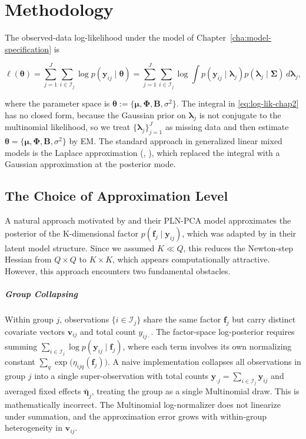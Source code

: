 \chapter{Methodology}
\label{cha:methodology}

The observed-data log-likelihood under the model of Chapter~\ref{cha:model-specification} is

\begin{equation}
    \ell(\bm{\theta})=\sum_{j=1}^{J}\sum_{i\in \mathcal{I}_{j}}\log p(\bm{y}_{ij}\mid \bm{\theta})=\sum_{j=1}^{J}\sum_{i\in \mathcal{I}_{j}}\log \int p(\bm{y}_{ij}\mid \bm{\lambda}_{j})p(\bm{\lambda}_{j}\mid \bm{\Sigma})\,d\bm{\lambda}_{j},
    \label{eq:log-lik-chap2}
\end{equation}

where the parameter space is $\bm{\theta}:=\{\bm{\mu}, \bm{\Phi}, \mathbf{B},\sigma^{2}\}$. The integral in \eqref{eq:log-lik-chap2} has no closed form, because the Gaussian prior on $\bm{\lambda}_{j}$ is not conjugate to the multinomial likelihood, so we treat $\{\bm{\lambda}_{j}\}_{j=1}^{J}$ as missing data and then estimate $\bm{\theta}=\{\bm{\mu}, \bm{\Phi}, \mathbf{B},\sigma^{2}\}$ by EM. The standard approach in generalized linear mixed models is the Laplace approximation (\citep{Breslow_1993}, \citep{Tierney01031986}), which replaced the integral with a Gaussian approximation at the posterior mode.

\iffalse
\section{The Choice of Approximation Level}
\label{sec:the-choice-of-approximation-level}

A natural approach motivated by \citet{chiquet2018variational} and their PLN-PCA model approximates the posterior of the K-dimensional factor $p(\mathbf{f}_{j}\mid \bm{y}_{ij})$, which was adapted by \citet{mcgillycuddy2024parsimoniouslyfittinglargemultivariate} in their latent model structure. Since we assumed $K\ll Q$, this reduces the Newton-step Hessian from $Q\times Q$ to $K\times K$, which appears computationally attractive. However, this approach encounters two fundamental obstacles. 

\paragraph*{Group Collapsing} Within group $j$, observations $\{i\in \mathcal{I}_{j}\}$ share the same factor $\mathbf{f}_{j}$ but carry distinct covariate vectors $\bm{v}_{ij}$ and total count $y_{ij\cdot}$. The factor-space log-posterior requires summing $\sum_{i\in \mathcal{I}_{j}}\log p(\bm{y}_{ij}\mid \mathbf{f}_{j})$, where each term involves its own normalizing constant $\sum_q \exp\bigl(\eta_{ijq}(\mathbf{f}_j)\bigr)$. A naive implementation collapses all observations in group $j$ into a single super-observation with total counts $\bm{y}_{\cdot j} = \sum_{i\in \mathcal{I}_{j}} \bm{y}_{ij}$ and averaged fixed effects $\bar{\bm{\eta}}_{j}$, treating the group as a single Multinomial draw. This is mathematically incorrect. The Multinomial log-normalizer does not linearize under summation, and the approximation error grows with within-group heterogeneity in $\bm{v}_{ij}$. 

